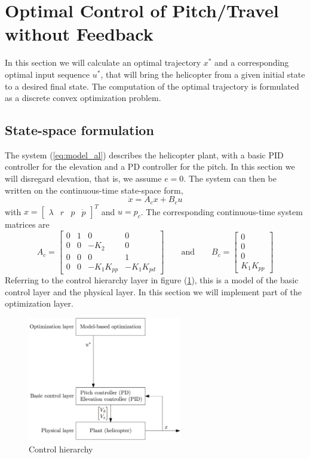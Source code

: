 \section{Optimal Control of Pitch/Travel without Feedback}\label{sec:prob2}

In this section we will calculate an optimal trajectory $x^*$ and a
corresponding optimal input sequence $u^*$, that will bring the helicopter
from a given initial state to a desired final state. The computation of the
optimal trajectory is formulated as a discrete convex optimization problem.

\subsection{State-space formulation}
The system (\ref{eq:model_al}) describes the helicopter plant, with a basic
PID controller for the elevation and a PD controller for the pitch. In this
section we will disregard elevation, that is, we assume $e = 0$. The system
can then be written on the continuous-time state-space form,
\begin{equation}
    \dot{x} = A_cx + B_cu
    \label{eq:state_space_axbu}
\end{equation}
with $x = \begin{bmatrix} \lambda & r & p & \dot{p} \end{bmatrix}^T$ and $u = p_c$.
The corresponding continuous-time system matrices are
\begin{equation}
	A_c = \begin{bmatrix} 0 & 1 & 0 & 0 \\ 0 & 0 & -K_2 & 0 \\ 0 & 0 & 0 & 1 \\ 0 & 0 & -K_1K_{pp} & -K_1K_{pd} \end{bmatrix}
	\qquad\text{and}\qquad
	B_c = \begin{bmatrix}0 \\ 0 \\ 0 \\K_1K_{pp} \end{bmatrix}
\end{equation}
Referring to the control hierarchy layer in figure (\ref{fig:control_hierarchy}),
this is a model of the basic control layer and the physical layer. In this section
we will implement part of the optimization layer.
\begin{figure}[ht]
	\centering
	\includegraphics[width=0.6\textwidth]{figures/control_hierarchy_day2}
	\caption{Control hierarchy}
	\label{fig:control_hierarchy}
\end{figure}

